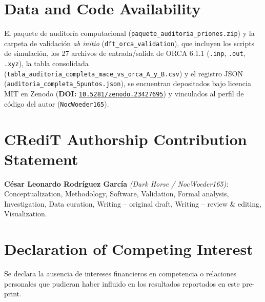 \documentclass[10pt,twocolumn,a4paper]{article}
\begin{document}
\section*{Data and Code Availability}
\footnotesize
El paquete de auditoría computacional (\texttt{paquete\_auditoria\_priones.zip}) y la carpeta de validación \textit{ab initio} (\texttt{dft\_orca\_validation}), que incluyen los scripts de simulación, los 27 archivos de entrada/salida de ORCA 6.1.1 (\texttt{.inp}, \texttt{.out}, \texttt{.xyz}), la tabla consolidada (\texttt{tabla\_auditoria\_completa\_mace\_vs\_orca\_A\_y\_B.csv}) y el registro JSON (\texttt{auditoria\_completa\_5puntos.json}), se encuentran depositados bajo licencia MIT en Zenodo (\textbf{DOI:} \href{https://doi.org/10.5281/zenodo.23427695}{\texttt{10.5281/zenodo.23427695}}) y vinculados al perfil de código del autor (\texttt{NocWoeder165}).

\section*{CRediT Authorship Contribution Statement}
\footnotesize
\textbf{César Leonardo Rodríguez García} \textit{(Dark Horse / NocWoeder165)}: Conceptualization, Methodology, Software, Validation, Formal analysis, Investigation, Data curation, Writing -- original draft, Writing -- review \& editing, Visualization.

\section*{Declaration of Competing Interest}
\footnotesize
Se declara la ausencia de intereses financieros en competencia o relaciones personales que pudieran haber influido en los resultados reportados en este pre-print.
\end{document}

